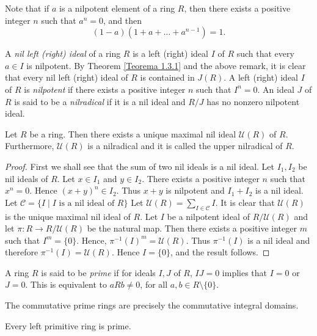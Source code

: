 Note that if $a$ is a nilpotent element of a ring $R$, then there exists a positive integer $n$ such that $a^n=0$, and then
$$(1-a)(1+a+\dots+a^{n-1})=1.$$

A {\em nil left (right) ideal} of a ring $R$ is a left (right) ideal $I$ of $R$ such that every $a\in I$ is nilpotent. 
By Theorem \ref{Teorema 1.3.1} and the above remark,
it is clear that every nil left (right) ideal of $R$ is contained in $J(R)$.
A left (right) ideal $I$ of $R$ is {\em nilpotent} if there exists a positive integer $n$ 
such that $I^n=0$. An ideal $J$ of $R$ is said to be a {\em nilradical} if it is a nil ideal and $R/J$ has no nonzero nilpotent ideal.

\begin{proposition}\label{Prop1.3.4}
Let $R$ be a ring. Then there exists a unique maximal nil ideal $\mathcal{U}(R)$ of $R$. 
Furthermore, $\mathcal{U}(R)$ is a nilradical and it is called the upper nilradical of $R$.
\end{proposition}

\begin{proof}
First we shall see that the sum of two nil ideals is a nil ideal. Let $I_1,I_2$ be  nil ideals of $R$. 
Let $x\in I_1$ and $y\in I_2$. There exists a positive integer $n$ such that $x^n=0$. Hence $(x+y)^n\in
I_2$. Thus $x+y$ is nilpotent and $I_1+I_2$ is a nil ideal. Let $\mathcal{C}=\{ I\mid I\mbox{ is a nil ideal of }R\}$
Let $\mathcal{U}(R)=\sum_{I\in \mathcal{C}}I$. It is clear that  $\mathcal{U}(R)$ is the unique maximal nil ideal of $R$. 
Let $I$ be a nilpotent ideal of $R/\mathcal{U}(R)$ and let
$\pi\colon R\rightarrow R/\mathcal{U}(R)$ be the natural map. Then
there exists a positive integer $m$ such that $I^m=\{0\}$. Hence, $\pi
^{-1}(I)^m=\mathcal{U}(R)$. Thus $\pi ^{-1}(I)$ is a nil ideal and therefore
$\pi ^{-1}(I)=\mathcal{U}(R)$. Hence $I=\{0\}$, and the result follows.
\end{proof}

A ring $R$ is said to be {\em prime} if for ideals $I,J$ of $R$, $IJ=0$ implies that
$I=0$ or $J=0$. This is equivalent to $aRb\neq 0$, for all $a,b\in R\setminus\{0\}$.

\begin{example}
The commutative prime rings are precisely the commutative integral domains.
\end{example}

\begin{proposition}\label{Prop1.3.5}
Every left primitive ring is prime.
\end{proposition}

